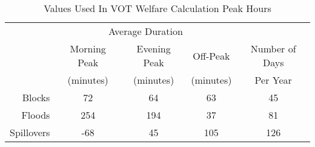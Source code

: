 \captionsetup{labelsep=newline}
\begin{table}[!htbp]
\centering

\caption{Values Used In VOT Welfare Calculation \newline Peak Hours}
\label{table:VOT-peak-desc}

		\begin{tabular}{r c c c c}
		    \hline
		    \hline
		    & \multicolumn{3}{c}{Average Duration} &  \\
		    & Morning Peak & Evening Peak & Off-Peak & Number of Days  \\
		    & (minutes) & (minutes) & (minutes) & Per Year \\
		    \hline
		    Blocks & 72 & 64 & 63 & 45 \\
		    Floods & 254 & 194 & 37 & 81 \\
		    Spillovers & -68 & 45 & 105 & 126 \\
		    \hline
		    \hline
		  \end{tabular}
\end{table} 
		 
